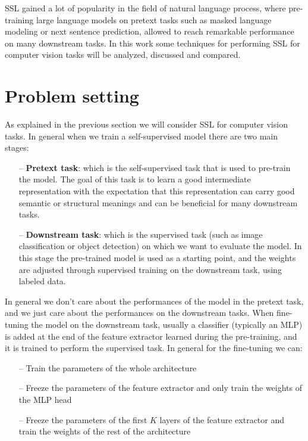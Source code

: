 \documentclass[12pt]{article}
\begin{document}
	SSL gained a lot of popularity in the field of natural language process, where pre-training large language models on pretext tasks such as masked language modeling or next sentence prediction, allowed to reach remarkable performance on many downstream tasks. In this work some techniques for performing SSL for computer vision tasks will be analyzed, discussed and compared.
	
	\section{Problem setting}
	As explained in the previous section we will consider SSL for computer vision tasks. In general when we train a self-supervised model there are two main stages:
	\begin{itemize}
		\item[--] \textbf{Pretext task}: which is the self-supervised task that is used to pre-train the model. The goal of this task is to learn a good intermediate representation with the expectation that this representation can carry good semantic or structural meanings and can be beneficial for many downstream tasks.
		\item[--] \textbf{Downstream task}: which is the supervised task (such as image classification or object detection) on which we want to evaluate the model. In this stage the pre-trained model is used as a starting point, and the weights are adjusted through supervised training on the downstream task, using labeled data.
	\end{itemize}
	In general we don't care about the performances of the model in the pretext task, and we just care about the performances on the downstream tasks. When fine-tuning the model on the downstream task, usually a classifier (typically an MLP) is added at the end of the feature extractor learned during the pre-training, and it is trained to perform the supervised task. In general for the fine-tuning we can:
	\begin{itemize}
		\item[--] Train the parameters of the whole architecture
		\item[--] Freeze the parameters of the feature extractor and only train the weights of the MLP head
		\item[--] Freeze the parameters of the first $K$ layers of the feature extractor and train the weights of the rest of the architecture
	\end{itemize}
\end{document}
